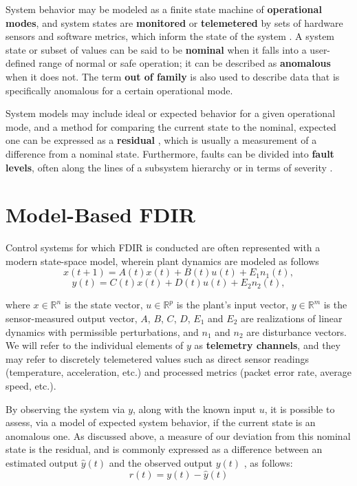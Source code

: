 System behavior may be modeled as a finite state machine of \textbf{operational modes}, and system states are \textbf{monitored} or \textbf{telemetered} by sets of hardware sensors and software metrics, which inform the state of the system \cite{dearden2004real}. A system state or subset of values can be said to be \textbf{nominal} when it falls into a user-defined range of normal or safe operation; it can be described as \textbf{anomalous} when it does not. The term \textbf{out of family} is also used to describe data that is specifically anomalous for a certain operational mode.

System models may include ideal or expected behavior for a given operational mode, and a method for comparing the current state to the nominal, expected one can be expressed as a \textbf{residual} \cite{hwang2010survey}, which is usually a measurement of a difference from a nominal state. Furthermore, faults can be divided into \textbf{fault levels}, often along the lines of a subsystem hierarchy or in terms of severity \cite{tipaldi2014spacecraft}.

\section{Model-Based FDIR}

Control systems for which FDIR is conducted are often represented with a modern state-space model, wherein plant dynamics are modeled as follows \cite{hwang2010survey}
\begin{equation} \label{eq:plant_model1}
    x(t+1) = A(t) x(t) + B(t) u(t) + E_{1}n_{1}(t),
\end{equation}
\begin{equation} \label{eq:plant_model2}
    y(t) = C(t) x(t) + D(t) u(t) + E_{2}n_{2}(t),
\end{equation}

where $x \in \mathbb{R}^{n}$ is the state vector, $u \in \mathbb{R}^{p}$ is the plant's input vector, $y \in \mathbb{R}^{m}$ is the sensor-measured output vector, $A$, $B$, $C$, $D$, $E_{1}$ and $E_{2}$ are realizations of linear dynamics with permissible perturbations, and $n_{1}$ and $n_{2}$ are disturbance vectors. We will refer to the individual elements of $y$ as \textbf{telemetry channels}, and they may refer to discretely telemetered values such as direct sensor readings (temperature, acceleration, etc.) and processed metrics (packet error rate, average speed, etc.).

By observing the system via $y$, along with the known input $u$, it is possible to assess, via a model of expected system behavior, if the current state is an anomalous one. As discussed above, a measure of our deviation from this nominal state is the residual, and is commonly expressed as a difference between an estimated output $\hat{y}(t)$ and the observed output $y(t)$ \cite{hwang2010survey}, as follows:
\begin{equation} \label{eq:residual_generation}
r(t) = y(t) - \hat{y}(t)
\end{equation}

